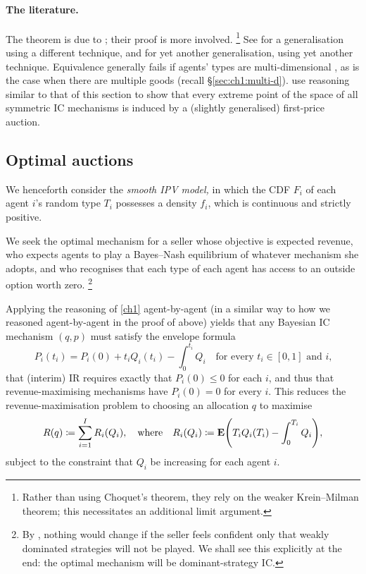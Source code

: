 \paragraph{The literature.}
The theorem is due to \textcite{ManelliVincent2010};
their proof is more involved.%
	\footnote{Rather than using Choquet's theorem, they rely on the weaker Krein--Milman theorem; this necessitates an additional limit argument.}
See \textcite{GershkovEtAl2013} for a generalisation using a different technique, and \textcite{KleinerMoldovanuStrack2021} for yet another generalisation, using yet another technique.
Equivalence generally fails if agents' types are multi-dimensional \parencite{JehielMoldovanuStacchetti1999}, as is the case when there are multiple goods (recall §\ref{sec:ch1:multi-d}).
\textcite{JeongPycia2023} use reasoning similar to that of this section to show that every extreme point of the space of all symmetric IC mechanisms is induced by a (slightly generalised) first-price auction.



\subsection{Optimal auctions}
\label{sec:ch2:optimal_auctions}

We henceforth consider the \emph{smooth IPV model,}
in which the CDF $F_i$ of each agent $i$'s random type $T_i$
possesses a density $f_i$, which is continuous and strictly positive.

We seek the optimal mechanism for a seller
whose objective is expected revenue,
who expects agents to play a Bayes--Nash equilibrium of whatever mechanism she adopts,
and who recognises that each type of each agent has access to an outside option worth zero.%
	\footnote{By , nothing would change if the seller feels confident only that weakly dominated strategies will not be played. We shall see this explicitly at the end: the optimal mechanism will be dominant-strategy IC.}

Applying the reasoning of \cref{ch1} agent-by-agent (in a similar way to how we reasoned agent-by-agent in the proof of  above)
yields that any Bayesian IC mechanism $(q,p)$ must satisfy the envelope formula
%
\begin{equation*}
	P_i(t_i) = P_i(0) + t_i Q_i(t_i) - \int_0^{t_i} Q_i
	\quad \text{for every $t_i \in [0,1]$ and $i$,}
\end{equation*}
%
that (interim) IR requires exactly that $P_i(0) \leq 0$ for each $i$,
and thus that revenue-maximising mechanisms have $P_i(0)=0$ for every $i$.
This reduces the revenue-maximisation problem to choosing an allocation $q$ to maximise
%
\begin{equation*}
	R(q) \coloneqq \sum_{i=1}^I R_i(Q_i) ,
	\quad \text{where} \quad
	R_i(Q_i)
	\coloneqq \E\left( T_i Q_i(T_i) - \int_0^{T_i} Q_i \right) ,
\end{equation*}
%
subject to the constraint that $Q_i$ be increasing for each agent $i$.

